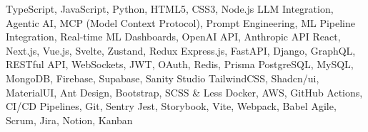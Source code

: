     \begin{cvskills}
         {TypeScript, JavaScript, Python, HTML5, CSS3, Node.js}
         {LLM Integration, Agentic AI, MCP (Model Context Protocol), Prompt Engineering, ML Pipeline Integration, Real-time ML Dashboards, OpenAI API, Anthropic API}
         {React, Next.js, Vue.js, Svelte, Zustand, Redux}
         {Express.js, FastAPI, Django, GraphQL, RESTful API, WebSockets, JWT, OAuth, Redis, Prisma}
         {PostgreSQL, MySQL, MongoDB, Firebase, Supabase, Sanity Studio}
         {TailwindCSS, Shadcn/ui, MaterialUI, Ant Design, Bootstrap, SCSS \& Less}
         {Docker, AWS, GitHub Actions, CI/CD Pipelines, Git, Sentry}
         {Jest, Storybook, Vite, Webpack, Babel}
         {Agile, Scrum, Jira, Notion, Kanban}
\end{cvskills}
